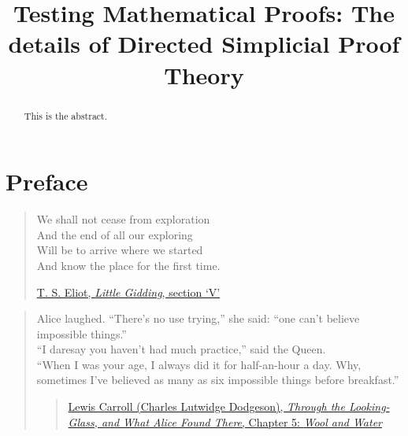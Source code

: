 \documentclass[a4paper,openany]{amsbook}
\begin{document}
\frontmatter
\sloppy

\title[DiSimplicial Proof Theory]{Testing Mathematical Proofs: The details of
Directed Simplicial Proof Theory}

%

\begin{abstract}
This is the abstract.
\end{abstract}

\maketitle
\tableofcontents
\mainmatter

\chapter*{Preface}

\begin{quotation}
We shall not cease from exploration \\
And the end of all our exploring \\
Will be to arrive where we started \\
And know the place for the first time.

\href{http://www.davidgorman.com/4Quartets/4-gidding.htm}{T. S. Eliot,
\textit{Little Gidding}, section `V'}
\end{quotation}

\vspace{0.5cm}

\begin{quotation}
Alice laughed. ``There's no use trying,'' she said: ``one can't believe
impossible things.'' \\ 
``I daresay you haven't had much practice,'' said the Queen. \\
``When I was your age, I always did it for half-an-hour a day. Why, sometimes
I've believed as many as six impossible things before breakfast.''

\begin{quote}
\href{http://en.wikiquote.org/wiki/Through_the_Looking-Glass#Chapter_5:_Wool_and_Water}{Lewis
Carroll (Charles Lutwidge Dodgeson), \textit{Through the Looking-Glass, and
What Alice Found There}, Chapter 5: \textit{Wool and Water}}
\end{quote}
\end{quotation}
\end{document}
